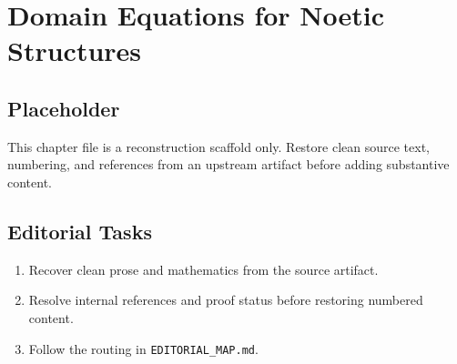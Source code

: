 \chapter{Domain Equations for Noetic Structures}
\label{chap:domain-equations-for-noetic-structures}

\section*{Placeholder}
This chapter file is a reconstruction scaffold only. Restore clean source text, numbering, and references from an upstream artifact before adding substantive content.

\section*{Editorial Tasks}
\begin{enumerate}
\item Recover clean prose and mathematics from the source artifact.
\item Resolve internal references and proof status before restoring numbered content.
\item Follow the routing in \texttt{EDITORIAL\_MAP.md}.
\end{enumerate}
